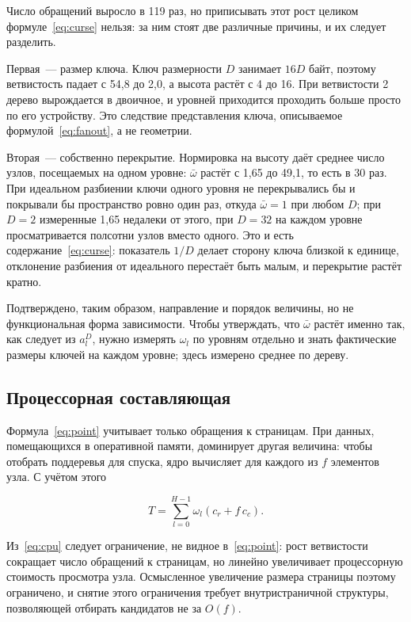 Число обращений выросло в 119 раз, но приписывать этот рост целиком
формуле~\eqref{eq:curse} нельзя: за ним стоят две различные причины, и их
следует разделить.

Первая~--- размер ключа. Ключ  размерности $D$ занимает $16D$ байт,
поэтому ветвистость падает с 54,8 до 2,0, а высота растёт с 4 до 16. При
ветвистости 2 дерево вырождается в двоичное, и уровней приходится проходить
больше просто по его устройству. Это следствие представления ключа, описываемое
формулой~\eqref{eq:fanout}, а не геометрии.

Вторая~--- собственно перекрытие. Нормировка на высоту даёт среднее число узлов,
посещаемых на одном уровне: $\bar\omega$ растёт с 1,65 до 49,1, то есть в 30
раз. При идеальном разбиении ключи одного уровня не перекрывались бы и покрывали
бы пространство ровно один раз, откуда $\bar\omega = 1$ при любом $D$; при $D=2$
измеренные 1,65 недалеки от этого, при $D=32$ на каждом уровне просматривается
полсотни узлов вместо одного. Это и есть содержание~\eqref{eq:curse}: показатель
$1/D$ делает сторону ключа близкой к единице, отклонение разбиения от идеального
перестаёт быть малым, и перекрытие растёт кратно.

Подтверждено, таким образом, направление и порядок величины, но не
функциональная форма зависимости. Чтобы утверждать, что $\bar\omega$ растёт
именно так, как следует из $a_l^D$, нужно измерять $\omega_l$ по уровням
отдельно и знать фактические размеры ключей на каждом уровне; здесь измерено
среднее по дереву.

\subsection{Процессорная составляющая}

Формула~\eqref{eq:point} учитывает только обращения к страницам. При данных,
помещающихся в оперативной памяти, доминирует другая величина: чтобы отобрать
поддеревья для спуска, ядро вычисляет  для каждого из $f$
элементов узла. С учётом этого

\begin{equation}
\label{eq:cpu}
T = \sum_{l=0}^{H-1} \omega_l \left( c_r + f\,c_c \right) .
\end{equation}

Из~\eqref{eq:cpu} следует ограничение, не видное в~\eqref{eq:point}: рост
ветвистости сокращает число обращений к страницам, но линейно увеличивает
процессорную стоимость просмотра узла. Осмысленное увеличение размера страницы
поэтому ограничено, и снятие этого ограничения требует внутристраничной
структуры, позволяющей отбирать кандидатов не за $O(f)$.


